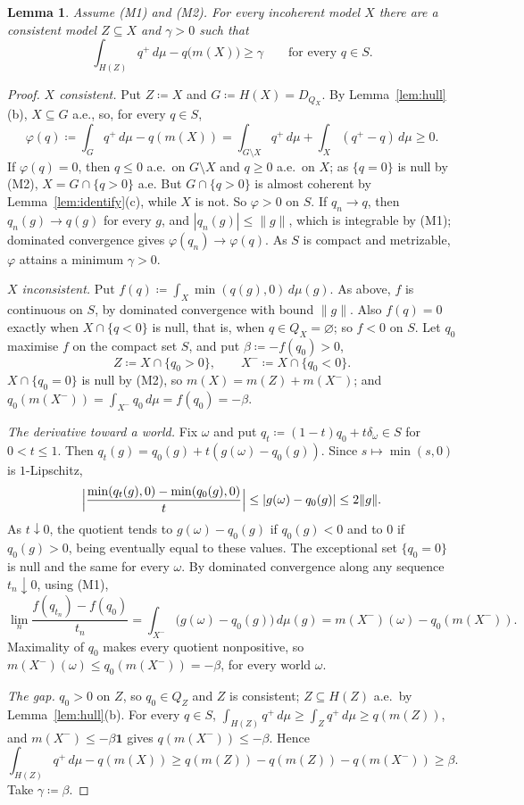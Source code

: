 \documentclass[11pt]{article}
\newtheorem{lemma}[theorem]{Lemma}
\theoremstyle{definition}
\newcommand{\one}{\mathbf 1}
\begin{document}
\begin{lemma}\label{lem:gap}
Assume (M1) and (M2). For every incoherent model $X$ there are a consistent model $Z\subseteq X$ and $\gamma>0$ such that
\[
\int_{H(Z)}q^+\,d\mu-q\bigl(m(X)\bigr)\ge\gamma\qquad\text{for every }q\in S.
\]
\end{lemma}
\begin{proof}
\emph{$X$ consistent.} Put $Z\coloneqq X$ and $G\coloneqq H(X)=D_{Q_X}$. By Lemma~\ref{lem:hull}(b), $X\subseteq G$ a.e., so, for every $q\in S$,
\[
\varphi(q)\coloneqq\int_Gq^+\,d\mu-q(m(X))=\int_{G\setminus X}q^+\,d\mu+\int_X(q^+-q)\,d\mu\ge0 .
\]
If $\varphi(q)=0$, then $q\le0$ a.e.\ on $G\setminus X$ and $q\ge0$ a.e.\ on $X$; as $\{q=0\}$ is null by (M2), $X=G\cap\{q>0\}$ a.e. But $G\cap\{q>0\}$ is almost coherent by Lemma~\ref{lem:identify}(c), while $X$ is not. So $\varphi>0$ on $S$. If $q_n\to q$, then $q_n(g)\to q(g)$ for every $g$, and $|q_n(g)|\le\|g\|$, which is integrable by (M1); dominated convergence gives $\varphi(q_n)\to\varphi(q)$. As $S$ is compact and metrizable, $\varphi$ attains a minimum $\gamma>0$.

\emph{$X$ inconsistent.} Put $f(q)\coloneqq\int_X\min(q(g),0)\,d\mu(g)$. As above, $f$ is continuous on $S$, by dominated convergence with bound $\|g\|$. Also $f(q)=0$ exactly when $X\cap\{q<0\}$ is null, that is, when $q\in Q_X=\varnothing$; so $f<0$ on $S$. Let $q_0$ maximise $f$ on the compact set $S$, and put $\beta\coloneqq-f(q_0)>0$,
\[
Z\coloneqq X\cap\{q_0>0\},\qquad X^-\coloneqq X\cap\{q_0<0\}.
\]
$X\cap\{q_0=0\}$ is null by (M2), so $m(X)=m(Z)+m(X^-)$; and $q_0(m(X^-))=\int_{X^-}q_0\,d\mu=f(q_0)=-\beta$.

\emph{The derivative toward a world.} Fix $\omega$ and put $q_t\coloneqq(1-t)q_0+t\delta_\omega\in S$ for $0<t\le1$. Then $q_t(g)=q_0(g)+t(g(\omega)-q_0(g))$. Since $s\mapsto\min(s,0)$ is $1$-Lipschitz,
\[
\Bigl|\frac{\min(q_t(g),0)-\min(q_0(g),0)}t\Bigr|\le|g(\omega)-q_0(g)|\le2\|g\| .
\]
As $t\downarrow0$, the quotient tends to $g(\omega)-q_0(g)$ if $q_0(g)<0$ and to $0$ if $q_0(g)>0$, being eventually equal to these values. The exceptional set $\{q_0=0\}$ is null and the same for every $\omega$. By dominated convergence along any sequence $t_n\downarrow0$, using (M1),
\[
\lim_n\frac{f(q_{t_n})-f(q_0)}{t_n}=\int_{X^-}\bigl(g(\omega)-q_0(g)\bigr)\,d\mu(g)=m(X^-)(\omega)-q_0(m(X^-)).
\]
Maximality of $q_0$ makes every quotient nonpositive, so $m(X^-)(\omega)\le q_0(m(X^-))=-\beta$, for every world $\omega$.

\emph{The gap.} $q_0>0$ on $Z$, so $q_0\in Q_Z$ and $Z$ is consistent; $Z\subseteq H(Z)$ a.e.\ by Lemma~\ref{lem:hull}(b). For every $q\in S$, $\int_{H(Z)}q^+\,d\mu\ge\int_Zq^+\,d\mu\ge q(m(Z))$, and $m(X^-)\le-\beta\one$ gives $q(m(X^-))\le-\beta$. Hence
\[
\int_{H(Z)}q^+\,d\mu-q(m(X))\ge q(m(Z))-q(m(Z))-q(m(X^-))\ge\beta .
\]
Take $\gamma\coloneqq\beta$.
\end{proof}
\end{document}
